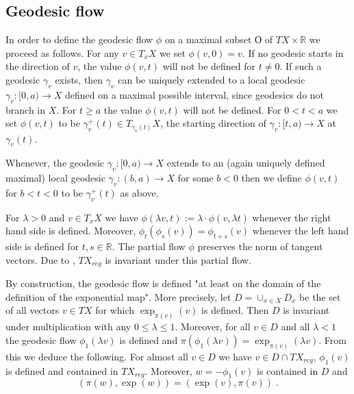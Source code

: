 \documentclass[12pt,leqno]{amsart}
\numberwithin{equation}{section}
\theoremstyle{definition}
\theoremstyle{remark}
\newcommand{\R}{\mathbb{R}}
\begin{document}
\subsection{Geodesic flow}
   In order to define the geodesic flow $\phi$ on a maximal subset $О$ of $TX \times \R $  we proceed as follows.
 For any  $v\in  T_xX$ we set $\phi (v,0)=v$.
 If no geodesic starts in the direction of $v$,
 the value $\phi (v,t)$ will not be defined for $t\neq 0$. If such a geodesic $\gamma_v$ exists, then $\gamma_v$   can be uniquely extended to a  local geodesic $\gamma_v :[0,a)\to X$  defined on a maximal possible interval, since  geodesics do not branch in $X$.  For $t\geq a$
 the value $\phi (v,t)$ will not be defined. For $0<t<a$ we set $\phi (v,t)$ to be $\gamma _v ^+ (t) \in T_{\gamma _v(t)} X$, the starting direction of $\gamma_v:[t,a) \to X$ at $\gamma_v (t)$.

 Whenever, the geodesic $\gamma _v:[0,a)\to X$ extends to an (again uniquely defined maximal)  local geodesic   $\gamma_v:(b,a) \to X$ for some $b<0$
 then we define $\phi (v,t)$ for $b<t<0$ to be $\gamma_v ^+ (t) $ as above.


For $\lambda >0$ and $v\in  T_x X$ we have  $\phi (\lambda v,t) :=\lambda \cdot \phi (v,\lambda t)$ whenever the right hand side is defined. Moreover,
 $\phi _t ( \phi _s (v))= \phi _{t+s} (v)$ whenever the left hand side is defined for $t,s\in \R$.
The partial flow $\phi$ preserves the norm of tangent vectors.  Due to \cite{Petparallel},  $TX_{reg}$ is invariant under this partial flow.



By construction, the geodesic flow is defined "at least on the domain of the definition of the exponential map".
More precisely, let $D=\cup _{x\in X} D_x$ be the set of all vectors $v\in TX$ for which $\exp _{\pi(v)} (v)$ is defined.
Then $D$ is invariant under multiplication with any $0\leq \lambda \leq 1$.  Moreover, for all $v\in D$ and all $\lambda <1$
the geodesic flow $\phi_1 (\lambda v)$ is defined and $\pi (\phi_1 (\lambda v))=  \exp _{\pi (v)} (\lambda v)$.
From this we deduce the following.
 For almost all $v\in D$ we have $v\in D\cap TX_{reg}$, $\phi _1(v)$ is defined  and contained in $TX_{reg}$. Moreover,
 $w=-\phi_1 (v)$ is contained in $D$  and 
\begin{equation} \label{eq:symm}
(\pi (w), \exp (w))=(\exp (v), \pi (v))\; .
\end{equation}
\end{document}
